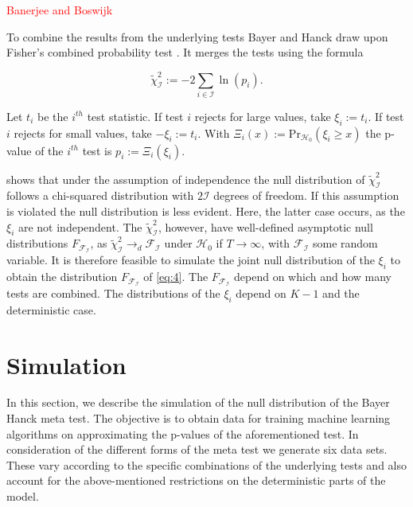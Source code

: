 \documentclass[12pt,a4paper]{article}
\begin{document}
\textcolor{red}{Banerjee and Boswijk}

To combine the results from the underlying tests Bayer and Hanck draw
upon Fisher's combined probability test \autocite{Fisher_1932}. It
merges the tests using the formula

\begin{equation}
\tilde{\chi}^2_{\mathcal{I}} := -2 \sum_{i \in \mathcal{I}} \ln{(p_i)}. 
\label{eq:4}
\end{equation}

Let \(t_i\) be the \(i^{th}\) test statistic. If test \(i\) rejects for
large values, take \(\xi_i := t_i\). If test \(i\) rejects for small
values, take \(-\xi_i := t_i\). With
\(\Xi_i(x) := \text{Pr}_{\mathcal{H_0}}(\xi_i \geq x)\) the p-value of
the \(i^{th}\) test is \(p_i := \Xi_i(\xi_i)\).

\textcite{Fisher_1932} shows that under the assumption of independence
the null distribution of \(\tilde{\chi}^2_{\mathcal{I}}\) follows a
chi-squared distribution with \(2\mathcal{I}\) degrees of freedom. If
this assumption is violated the null distribution is less evident. Here,
the latter case occurs, as the \(\xi_i\) are not independent. The
\(\tilde{\chi}^2_{\mathcal{I}}\), however, have well-defined asymptotic
null distributions \(F_{\mathcal{F_I}}\), as
\(\tilde{\chi}^2_{\mathcal{I}} \rightarrow_d \mathcal{F_I}\) under
\(\mathcal{H}_0\) if \(T \rightarrow \infty\), with \(\mathcal{F_I}\)
some random variable. It is therefore feasible to simulate the joint
null distribution of the \(\xi_i\) to obtain the distribution
\(F_{\mathcal{F_I}}\) of \eqref{eq:4}. The \(F_{\mathcal{F_I}}\) depend
on which and how many tests are combined. The distributions of the
\(\xi_i\) depend on \(K-1\) and the deterministic case.

\hypertarget{simulation}{%
\section{Simulation}\label{simulation}}

In this section, we describe the simulation of the null distribution of
the Bayer Hanck meta test. The objective is to obtain data for training
machine learning algorithms on approximating the p-values of the
aforementioned test. In consideration of the different forms of the meta
test we generate six data sets. These vary according to the specific
combinations of the underlying tests and also account for the
above-mentioned restrictions on the deterministic parts of the model.
\end{document}
